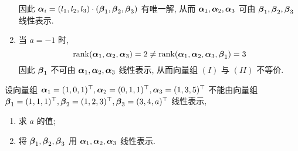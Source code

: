 \begin{solution}
\begin{enumerate}[label=(\arabic{*})]
$$              $$
              因此 $\vb*{\alpha}_i=(l_1, l_2, l_3)\cdot (\vb*{\beta}_1, \vb*{\beta}_2, \vb*{\beta}_3)$ 有唯一解, 从而 $\vb*{\alpha}_1, \vb*{\alpha}_2, \vb*{\alpha}_3$ 可由 $\vb*{\beta}_1, \vb*{\beta}_2, \vb*{\beta}_3$ 线性表示.
        \item 当 $a=-1$ 时, $$\rank(\vb*{\alpha}_1, \vb*{\alpha}_2, \vb*{\alpha}_3)=2\neq \rank(\vb*{\alpha}_1, \vb*{\alpha}_2, \vb*{\alpha}_3,\vb*{\beta}_1)=3$$
        因此 $\vb*{\beta}_1$ 不可由 $\vb*{\alpha}_1, \vb*{\alpha}_2, \vb*{\alpha}_3$ 线性表示, 从而向量组 $(I)$ 与 $(II)$ 不等价.
    \end{enumerate}
\end{solution}

\begin{example}[2011 数一]
    设向量组 $\vb*{\alpha}_1=(1,0,1)^\top,\vb*{\alpha}_2=(0,1,1)^\top,\vb*{\alpha}_3=(1,3,5)^\top$ 不能由向量组 $\vb*{\beta}_1=(1,1,1)^\top,\vb*{\beta}_2=(1,2,3)^\top,\vb*{\beta}_3=(3,4,a)^\top$ 线性表示,
    \begin{enumerate}[label=(\arabic{*})]
        \item 求 $a$ 的值;
        \item 将 $\vb*{\beta}_1, \vb*{\beta}_2, \vb*{\beta}_3$ 用 $\vb*{\alpha}_1, \vb*{\alpha}_2, \vb*{\alpha}_3$ 线性表示.
    \end{enumerate}
\end{example}
